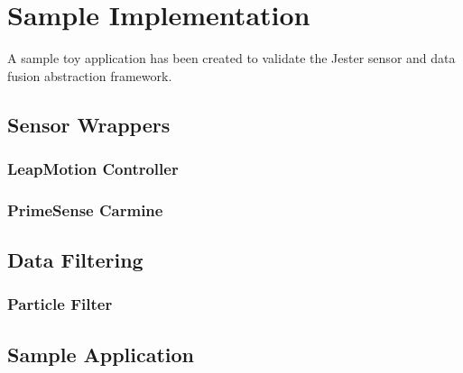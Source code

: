 \chapter{Sample Implementation}\label{chap:sample_app}

A sample toy application has been created to validate the Jester sensor and data fusion abstraction framework. 

\section{Sensor Wrappers}
\subsection{LeapMotion Controller}\label{sec:leap_impl}
\subsection{PrimeSense Carmine}\label{sec:carmine_impl}
\section{Data Filtering}\label{sec:fuser_impl}
\subsection{Particle Filter}\label{sec:filer_impl}
\section{Sample Application}\label{sec:app_impl}